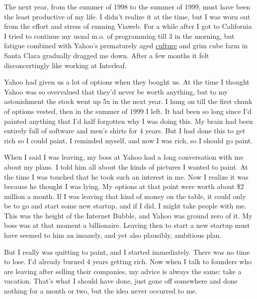 The next
                  year, from the summer of 1998 to the summer of 1999, must have
                  been the least productive of my life. I didn't realize it at
                  the time, but I was worn out from the effort and stress of
                  running Viaweb. For a while after I got to California I tried
                  to continue my usual m.o. of programming till 3 in the
                  morning, but fatigue combined with Yahoo's prematurely aged
                  \href{http://www.paulgraham.com/yahoo.html}{\underline{culture}} and grim cube farm in
                  Santa Clara gradually dragged me down. After a few months it
                  felt disconcertingly like working at Interleaf.

Yahoo
                  had given us a lot of options when they bought us. At the time
                  I thought Yahoo was so overvalued that they'd never be worth
                  anything, but to my astonishment the stock went up 5x in the
                  next year. I hung on till the first chunk of options vested,
                  then in the summer of 1999 I left. It had been so long since
                  I'd painted anything that I'd half forgotten why I was doing
                  this. My brain had been entirely full of software and men's
                  shirts for 4 years. But I had done this to get rich so I could
                  paint, I reminded myself, and now I was rich, so I should go
                  paint.

When I said I was leaving, my boss at Yahoo
                  had a long conversation with me about my plans. I told him all
                  about the kinds of pictures I wanted to paint. At the time I
                  was touched that he took such an interest in me. Now I realize
                  it was because he thought I was lying. My options at that
                  point were worth about \$2 million a month. If I was leaving
                  that kind of money on the table, it could only be to go and
                  start some new startup, and if I did, I might take people with
                  me. This was the height of the Internet Bubble, and Yahoo was
                  ground zero of it. My boss was at that moment a billionaire.
                  Leaving then to start a new startup must have seemed to him an
                  insanely, and yet also plausibly, ambitious plan.

But
                  I really was quitting to paint, and I started immediately.
                  There was no time to lose. I'd already burned 4 years getting
                  rich. Now when I talk to founders who are leaving after
                  selling their companies, my advice is always the same: take a
                  vacation. That's what I should have done, just gone off
                  somewhere and done nothing for a month or two, but the idea
                  never occurred to me.

